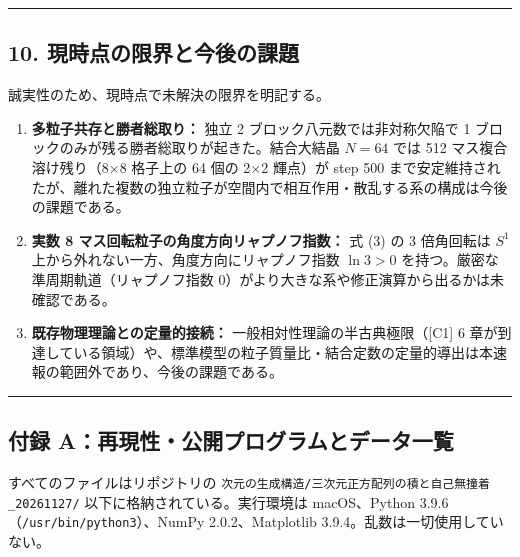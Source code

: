 \documentclass[
  a4paper,
]{ltjsarticle}
\providecommand{\tightlist}{%
  \setlength{\itemsep}{0pt}\setlength{\parskip}{0pt}}
\begin{document}
\begin{center}\rule{0.5\linewidth}{0.5pt}\end{center}

\subsection{10.
現時点の限界と今後の課題}\label{ux73feux6642ux70b9ux306eux9650ux754cux3068ux4ecaux5f8cux306eux8ab2ux984c}

誠実性のため、現時点で未解決の限界を明記する。

\begin{enumerate}
\def\labelenumi{\arabic{enumi}.}
\tightlist
\item
  \textbf{多粒子共存と勝者総取り：} 独立 2
  ブロック八元数では非対称欠陥で 1
  ブロックのみが残る勝者総取りが起きた。結合大結晶 \(N = 64\) では 512
  マス複合溶け残り（8×8 格子上の 64 個の 2×2 輝点）が step 500
  まで安定維持されたが、離れた複数の独立粒子が空間内で相互作用・散乱する系の構成は今後の課題である。
\item
  \textbf{実数 8 マス回転粒子の角度方向リャプノフ指数：} 式 (3) の 3
  倍角回転は \(S^1\) 上から外れない一方、角度方向にリャプノフ指数
  \(\ln 3 > 0\) を持つ。厳密な準周期軌道（リャプノフ指数
  \(0\)）がより大きな系や修正演算から出るかは未確認である。
\item
  \textbf{既存物理理論との定量的接続：}
  一般相対性理論の半古典極限（{[}C1{]} 6
  章が到達している領域）や、標準模型の粒子質量比・結合定数の定量的導出は本速報の範囲外であり、今後の課題である。
\end{enumerate}

\begin{center}\rule{0.5\linewidth}{0.5pt}\end{center}

\subsection{付録
A：再現性・公開プログラムとデータ一覧}\label{ux4ed8ux9332-aux518dux73feux6027ux516cux958bux30d7ux30edux30b0ux30e9ux30e0ux3068ux30c7ux30fcux30bfux4e00ux89a7}

すべてのファイルはリポジトリの
\texttt{次元の生成構造/\allowbreak{}三次元正方配列の積と自己無撞着\_\allowbreak{}20261127/\allowbreak{}}
以下に格納されている。実行環境は macOS、Python
3.9.6（\texttt{/\allowbreak{}usr/\allowbreak{}bin/\allowbreak{}python3}）、NumPy 2.0.2、Matplotlib
3.9.4。乱数は一切使用していない。
\end{document}
